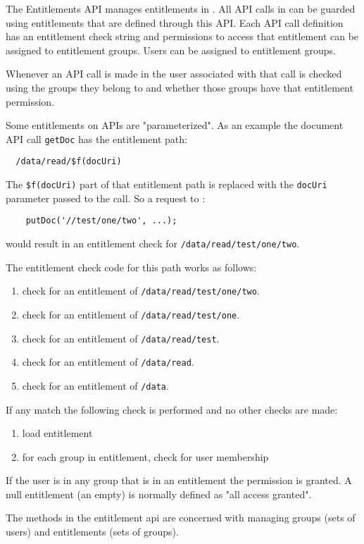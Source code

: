 The Entitlements API manages entitlements in \Rapture. All API calls in \Rapture can be guarded using
entitlements that are defined through this API. Each API call definition has an entitlement check string and
permissions to access that entitlement can be assigned to entitlement groups. Users can be assigned to entitlement groups.

Whenever an API call is made in \Rapture the user associated with that call is checked using the groups they belong to
and whether those groups have that entitlement permission.

Some entitlements on APIs are "parameterized". As an example the document API call \verb+getDoc+ has the entitlement path:

\begin{Verbatim}
  /data/read/$f(docUri)
\end{Verbatim}

The \verb+$f(docUri)+ part of that entitlement path is replaced with the \verb+docUri+ parameter passed to the call.
So a request to :

\begin{Verbatim}
    putDoc('//test/one/two', ...);
\end{Verbatim}

would result in an entitlement check for \verb+/data/read/test/one/two+.

The entitlement check code for this path works as follows:

\begin{enumerate}
  \item{check for an entitlement of \verb+/data/read/test/one/two+.}
  \item{check for an entitlement of \verb+/data/read/test/one+.}
  \item{check for an entitlement of \verb+/data/read/test+.}
  \item{check for an entitlement of \verb+/data/read+.}
  \item{check for an entitlement of \verb+/data+.}
\end{enumerate}

If any match the following check is performed and no other checks are made:

\begin{enumerate}
  \item{load entitlement}
  \item{for each group in entitlement, check for user membership}
\end{enumerate}

If the user is in any group that is in an entitlement the permission is granted. A null
entitlement (an empty) is normally defined as "all access granted".

The methods in the entitlement api are concerned with managing groups (sets of users) and entitlements (sets of groups).
